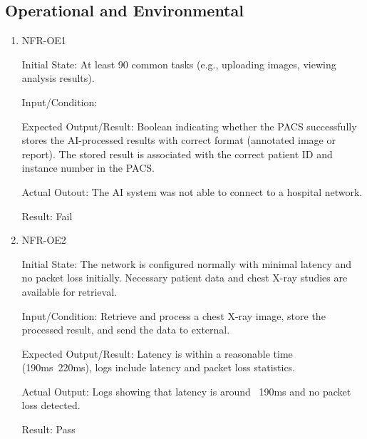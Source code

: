 \documentclass[12pt, titlepage]{article}
\begin{document}
\subsection{Operational and Environmental}

\begin{enumerate}

  \item{NFR-OE1\\}\label{NFR-OE1}

  Initial State: At least 90%
common tasks (e.g., uploading images, viewing analysis results).

  Input/Condition: 

  Expected Output/Result: Boolean indicating whether the PACS successfully stores the AI-processed results with correct format (annotated image or report). The stored result is associated with the correct patient ID and instance number in the PACS.

  Actual Outout: The AI system was not able to connect to a hospital network.

  Result: Fail

  \item{NFR-OE2\\}\label{NFR-OE2}

  Initial State: The network is configured normally with minimal latency and no packet loss initially. Necessary patient data and chest X-ray studies are available for retrieval.

  Input/Condition: Retrieve and process a chest X-ray image, store the processed result, and send the data to external.

  Expected Output/Result: Latency is within a reasonable time (190ms~220ms), logs include latency and packet loss statistics.

  Actual Output: Logs showing that latency is around ~190ms and no packet loss detected.

  Result: Pass

\end{enumerate}
\end{document}
